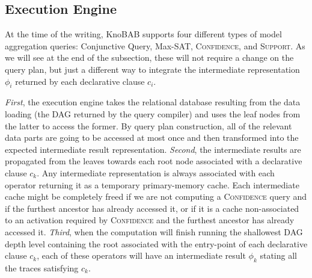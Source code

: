 
\subsection{Execution Engine} \label{ssec:xltlf}
At the time of the writing, KnoBAB supports four different types of model aggregation queries: Conjunctive Query, Max-SAT, \textsc{Confidence}, and \textsc{Support}. As we will see at the end of the subsection, these will not require a change on the query plan, but just a different way to integrate the intermediate representation $\phi_i$ returned by each declarative clause $c_i$. 

\textit{First}, the execution engine takes the relational database resulting from the data loading (the DAG returned by the query compiler) and uses the leaf nodes from the latter to access the former. By query plan construction, all of the relevant data parts are going to be accessed at most once and then transformed into the expected intermediate result representation. \textit{Second}, the intermediate results are propagated from the leaves towards each root node associated with a declarative clause $c_k$. Any intermediate representation is always associated with each operator returning it as a temporary primary-memory cache. Each intermediate cache  might be completely freed if we are not computing a  \textsc{Confidence} query and if the furthest ancestor has already accessed it, or if it is a cache non-associated to an activation required by \textsc{Confidence} and the furthest ancestor has already accessed it. \textit{Third}, when the computation will finish running the shallowest DAG depth level containing the \xLTLf root associated with the entry-point of each declarative clause $c_k$, each of these operators will have an intermediate result $\phi_k$ stating all the traces satisfying $c_k$.

